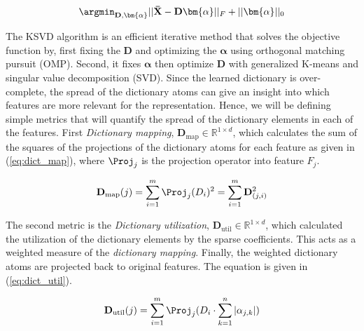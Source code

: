 \begin{equation}
    \label{eq:sparse}
    \argmin_{\mathbf{D},\bm{\alpha}} ||\mathbf{\bar{X}}- \mathbf{D}\bm{\alpha}||_F + ||\bm{\alpha}||_0
\end{equation}

The KSVD algorithm is an efficient iterative method that solves the objective function by, first fixing the $\mathbf{D}$ and optimizing the $\bm{\alpha}$ using orthogonal matching pursuit (OMP)\cite{Pati1993}. Second, it fixes $\bm{\alpha}$ then optimize $\mathbf{D}$ with generalized K-means and singular value decomposition (SVD). Since the learned dictionary is over-complete, the spread of the dictionary atoms can give an insight into which features are more relevant for the representation. Hence, we will be defining simple metrics that will quantify the spread of the dictionary elements in each of the features. First \textit{Dictionary mapping}, $\mathbf{D}_\textrm{map} \in \mathbb{R}^{1 \times d}$, which calculates the sum of the squares of the projections of the dictionary atoms for each feature as given in (\ref{eq:dict_map}), where $\Proj_j$ is the projection operator into feature $F_j$. 

\begin{equation}
    \label{eq:dict_map}
    \mathbf{D}_\textrm{map}(j)= \sum_{i=1}^m \Proj_j(D_i)^2  = \sum_{i=1}^m \mathbf{D}_{(j,i)}^2 
\end{equation}

 The second metric is the \textit{Dictionary utilization}, $\mathbf{D}_\textrm{util} \in \mathbb{R}^{1 \times d}$, which calculated the utilization of the dictionary elements by the sparse coefficients. This acts as a weighted measure of the \textit{dictionary mapping}. Finally, the weighted dictionary atoms are projected back to original features. The equation is given in (\ref{eq:dict_util}).
 
 \begin{equation}
    \label{eq:dict_util}
    \mathbf{D}_\textrm{util}(j)= \sum_{i=1}^m \Proj_j(D_i \cdot \sum_{k=1}^n |\alpha_{j,k}|)  
\end{equation}
 
